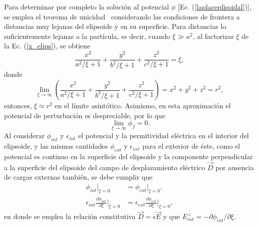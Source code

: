 Para determinar por completo la solución al potencial $\phi$ [Ec.  (\ref{laplaceplisoidal})], se emplea el teorema de unicidad~\cite{Griffiths} considerando las condiciones de frontera a distancias muy lejanas del elipsoide y en su superficie. Para distancias lo suficientemente lejanas a la partícula, es decir, cuando $\xi\gg a^2$, al factorizar $\xi$ de  la Ec. (\ref{x_elips}), se obtiene
\begin{equation*}
    \frac{x^2}{a^2/\xi+1}+\frac{y^2}{b^2/\xi+1}+\frac{z^2}{c^2/\xi+1}=\xi,
\end{equation*}
donde
\begin{equation*}
    \lim_{\xi\rightarrow\infty}\left(\frac{x^2}{a^2/\xi+1}+\frac{y^2}{b^2/\xi+1}+\frac{z^2}{c^2/\xi+1}\right)=x^2+y^2+z^2=r^2,
\end{equation*}
entonces, $\xi \simeq r^2$ en el límite asintótico. Asimismo, en esta aproximación el potencial de perturbación es despreciable, por lo que 
\begin{equation}
\lim_{\xi\rightarrow\infty}\phi_f=0
\label{limitephi_p}.
\end{equation}
Al considerar $\phi_{int}$ y $\epsilon_{int}$ el potencial y la permitividad eléctrica en el interior del elipsoide, y las mismas cantidades $\phi_{ext}$ y $\epsilon_{ext}$ para el exterior de éste, como el potencial es continuo en la superficie del elipsoide y la componente perpendicular a la superficie del elipsoide del campo de desplazamiento eléctrico $\Vec{D}$ por ausencia de cargas externas también, se debe cumplir que \cite{Griffiths}
\begin{subequations}
\label{condicionesfrontera}
\begin{align}
    \phi_{int}|_{\xi=0}&=\phi_{ext}|_{\xi=0}\label{cf1},\\
    \epsilon_{int}\frac{\partial \phi_{int}}{\partial \xi}\Big |_{\xi=0}&=
    \epsilon_{ext}\frac{\partial \phi_{ext}}{\partial \xi}\Big |_{\xi=0}\label{cf2},
\end{align}
\end{subequations}
en donde se emplea la relación constitutiva $\Vec{D}=\epsilon\Vec{E}$ y que $E_{int}^{\perp}=-\partial \phi_{int} /\partial \xi$.\\


